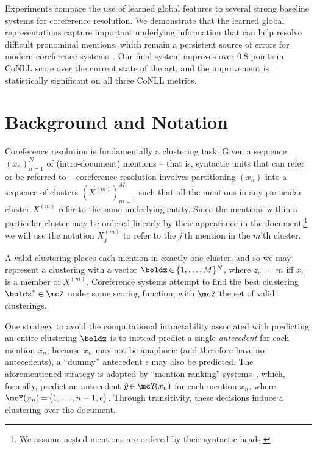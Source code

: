 \documentclass[11pt,letterpaper]{article}
\newcommand{\nicein}{\ensuremath{\,{\in}\,}}
\newcommand{\niceq}{\ensuremath{\,{=}\,}}
\begin{document}
Experiments compare the use of learned global features to several
strong baseline systems for coreference resolution. We demonstrate that the
learned global representations capture important underlying information that can help
resolve difficult pronominal mentions, which remain a persistent source of  errors for modern coreference systems~\cite{DandK:13,KandK:13,wiseman15learning,martschat15latent}. Our final system improves over 0.8 points in CoNLL score over the current state of the art, and the improvement is statistically significant on all three CoNLL metrics.
 
\section{Background and Notation}
Coreference resolution is fundamentally a clustering task. Given a
sequence $(x_n)_{n=1}^N$ of (intra-document) mentions -- that is, syntactic units that can refer or be referred to --
coreference resolution involves partitioning $(x_n)$ into a sequence
of clusters $(X^{(m)})_{m = 1}^M$ such that all the mentions in any
particular cluster $X^{(m)}$ refer to the same underlying
entity. Since the mentions within a particular cluster may be ordered
linearly by their appearance in the document,\footnote{We assume
  nested mentions are ordered by their syntactic heads.} we will use
the notation $X_j^{(m)}$ to refer to the $j$'th mention in the $m$'th
cluster.

A valid clustering places each mention in exactly one cluster, and so
we may represent a clustering with a vector $\boldz \nicein \{1,\ldots,M\}^N$, where $z_n \niceq m$ iff $x_n$ is a
member of $X^{(m)}$. Coreference systems attempt to
find the best clustering $\boldz^* \in \mcZ$ under some scoring
function, with $\mcZ$ the set of valid clusterings.

One strategy to avoid the computational intractability associated with predicting an entire clustering $\boldz$ is to instead predict a single \textit{antecedent} for each mention $x_n$; because $x_n$ may not be anaphoric (and therefore have no antecedents), a ``dummy'' antecedent $\epsilon$ may also be predicted. The aforementioned strategy is adopted by ``mention-ranking'' systems~\cite{DandB:08,RandN:09,DandK:13}, which, formally, predict an antecedent $\hat{y} \nicein \mcY(x_n)$ for each mention $x_n$, where $\mcY(x_n) \niceq \{1, \ldots, n-1,\epsilon\}$. Through transitivity, these decisions induce a clustering over the document.
\end{document}
